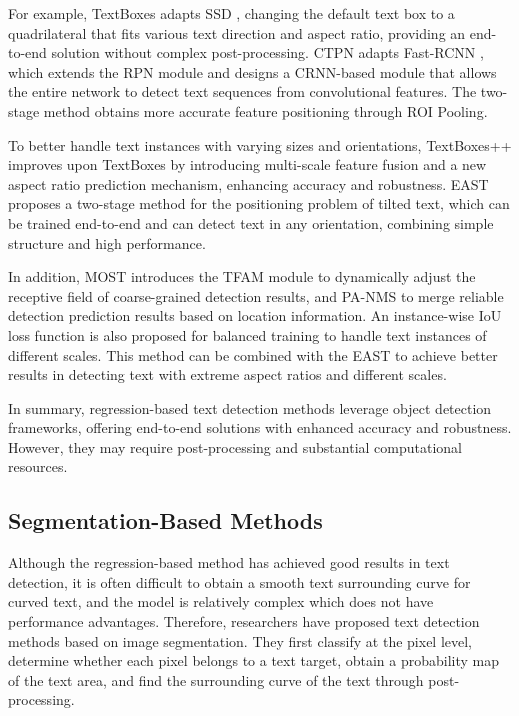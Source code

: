 \documentclass[12pt,twoside]{report}
\begin{document}
For example, TextBoxes \cite{liao2017textboxes} adapts SSD \cite{liu2016ssd}, changing the default text box to a quadrilateral that fits various text direction and aspect ratio, providing an end-to-end solution without complex post-processing. CTPN \cite{tian2016ctpn} adapts Fast-RCNN \cite{girshick2015fastrcnn}, which extends the RPN module and designs a CRNN-based \cite{shi2016end} module that allows the entire network to detect text sequences from convolutional features. The two-stage method obtains more accurate feature positioning through ROI Pooling.

To better handle text instances with varying sizes and orientations, TextBoxes++ \cite{liao2018textboxes++} improves upon TextBoxes \cite{liao2017textboxes} by introducing multi-scale feature fusion and a new aspect ratio prediction mechanism, enhancing accuracy and robustness. EAST \cite{zhou2017east} proposes a two-stage method for the positioning problem of tilted text, which can be trained end-to-end and can detect text in any orientation, combining simple structure and high performance.

In addition, MOST \cite{he2021most} introduces the TFAM module to dynamically adjust the receptive field of coarse-grained detection results, and PA-NMS to merge reliable detection prediction results based on location information. An instance-wise IoU loss function is also proposed for balanced training to handle text instances of different scales. This method can be combined with the EAST \cite{zhou2017east} to achieve better results in detecting text with extreme aspect ratios and different scales.

In summary, regression-based text detection methods leverage object detection frameworks, offering end-to-end solutions with enhanced accuracy and robustness. However, they may require post-processing and substantial computational resources.

\subsection{Segmentation-Based Methods}
Although the regression-based method has achieved good results in text detection, it is often difficult to obtain a smooth text surrounding curve for curved text, and the model is relatively complex which does not have performance advantages. Therefore, researchers have proposed text detection methods based on image segmentation. They first classify at the pixel level, determine whether each pixel belongs to a text target, obtain a probability map of the text area, and find the surrounding curve of the text through post-processing.
\end{document}
